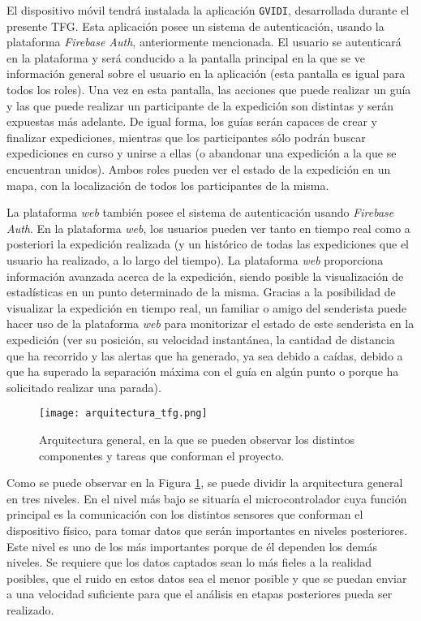 El dispositivo móvil tendrá instalada la aplicación \texttt{GVIDI}, desarrollada durante el presente \ac{TFG}. Esta aplicación posee un sistema de autenticación, usando la plataforma \textit{Firebase Auth}, anteriormente mencionada. El usuario se autenticará en la plataforma y será conducido a la pantalla principal en la que se ve información general sobre el usuario en la aplicación (esta pantalla es igual para todos los roles). Una vez en esta pantalla, las acciones que puede realizar un guía y las que puede realizar un participante de la expedición son distintas y serán expuestas más adelante. De igual forma, los guías serán capaces de crear y finalizar expediciones, mientras que los participantes sólo podrán buscar expediciones en curso y unirse a ellas (o abandonar una expedición a la que se encuentran unidos). Ambos roles pueden ver el estado de la expedición en un mapa, con la localización de todos los participantes de la misma. 

La plataforma \textit{web} también posee el sistema de autenticación usando \textit{Firebase Auth}. En la plataforma \textit{web}, los usuarios pueden ver tanto en tiempo real como a posteriori la expedición realizada (y un histórico de todas las expediciones que el usuario ha realizado, a lo largo del tiempo). La plataforma \textit{web} proporciona información avanzada acerca de la expedición, siendo posible la visualización de estadísticas en un punto determinado de la misma. Gracias a la posibilidad de visualizar la expedición en tiempo real, un familiar o amigo del senderista puede hacer uso de la plataforma \textit{web} para monitorizar el estado de este senderista en la expedición (ver su posición, su velocidad instantánea, la cantidad de distancia que ha recorrido y las alertas que ha generado, ya sea debido a caídas, debido a que ha superado la separación máxima con el guía en algún punto o porque ha solicitado realizar una parada).

\begin{figure}[!h]
\begin{center}
\texttt{[image: arquitectura\_tfg.png]}
\caption{Arquitectura general, en la que se pueden observar los distintos componentes y tareas que conforman el proyecto.}
\label{fig:arquitectura}
\end{center}
\end{figure}

Como se puede observar en la Figura \ref{fig:arquitectura}, se puede dividir la arquitectura general en tres niveles. En el nivel más bajo se situaría el microcontrolador cuya función principal es la comunicación con los distintos sensores que conforman el dispositivo físico, para tomar datos que serán importantes en niveles posteriores. Este nivel es uno de los más importantes porque de él dependen los demás niveles. Se requiere que los datos captados sean lo más fieles a la realidad posibles, que el ruido en estos datos sea el menor posible y que se puedan enviar a una velocidad suficiente para que el análisis en etapas posteriores pueda ser realizado. 

